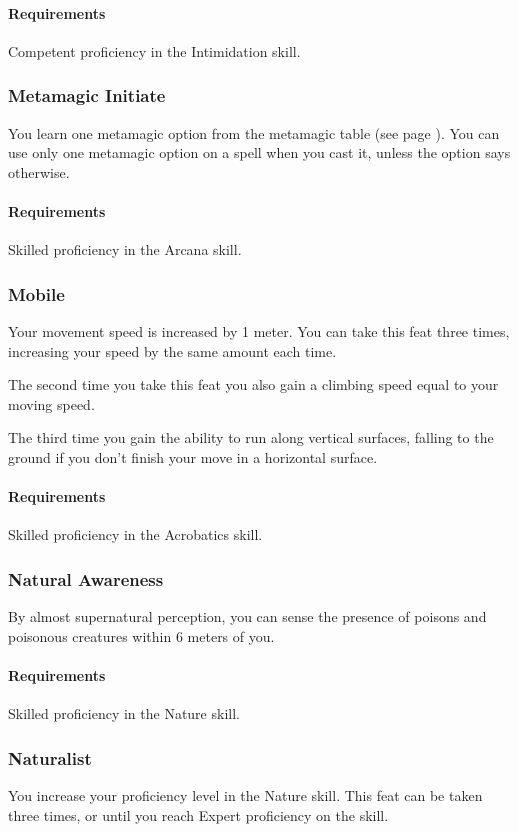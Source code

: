     \paragraph{Requirements} Competent proficiency in the Intimidation skill.
\subsubsection{Metamagic Initiate} \label{feat::metamagicinitiate}
    You learn one metamagic option from the metamagic table (see page \pageref{ssec::metamagic}).
    You can use only one metamagic option on a spell when you cast it, unless the option says otherwise.
    \paragraph{Requirements} Skilled proficiency in the Arcana skill.
\subsubsection{Mobile} \label{feat::mobile}
    Your movement speed is increased by 1 meter.
    You can take this feat three times, increasing your speed by the same amount each time.

    The second time you take this feat you also gain a climbing speed equal to your moving speed.

    The third time you gain the ability to run along vertical surfaces, falling to the ground if you don't finish your move in a horizontal surface.
    \paragraph{Requirements} Skilled proficiency in the Acrobatics skill.
\subsubsection{Natural Awareness} \label{feat::naturalawareness}
    By almost supernatural perception, you can sense the presence of poisons and poisonous creatures within 6 meters of you.

    \paragraph{Requirements} Skilled proficiency in the Nature skill.
\subsubsection{Naturalist} \label{feat::naturalist}
    You increase your proficiency level in the Nature skill.
    This feat can be taken three times, or until you reach Expert proficiency on the skill.
